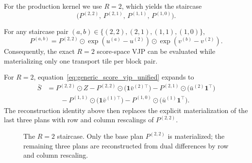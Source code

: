 For the production kernel we use $R=2$, which yields the staircase
\[
\bigl(P^{(2,2)},\,P^{(2,1)},\,P^{(1,1)},\,P^{(1,0)}\bigr).
\]

\begin{proposition}\label{thm:single_base_main}
For any staircase pair $(a,b)\in\{(2,2),(2,1),(1,1),(1,0)\}$,
\[
P^{(a,b)}
=
P^{(2,2)}
\odot
\exp(u^{(a)}-u^{(2)})
\odot
\exp(v^{(b)}-v^{(2)}).
\]
Consequently, the exact $R=2$ score-space VJP can be evaluated while materializing only one transport tile per block pair.
\end{proposition}

For $R=2$, equation~\eqref{eq:generic_score_vjp_unified} expands to
\begin{align}
\bar S
&=
P^{(2,2)} \odot Z
-
P^{(2,2)} \odot \bigl(\mathbf{1}\bar v^{(2)\top}\bigr)
-
P^{(2,1)} \odot \bigl(\bar u^{(2)}\mathbf{1}^\top\bigr) \nonumber \\
&\qquad
-
P^{(1,1)} \odot \bigl(\mathbf{1}\bar v^{(1)\top}\bigr)
-
P^{(1,0)} \odot \bigl(\bar u^{(1)}\mathbf{1}^\top\bigr).
\label{eq:r2_expanded_vjp}
\end{align}
The reconstruction identity above then replaces the explicit materialization of the last three plans with row and column rescalings of $P^{(2,2)}$.

\begin{figure}[h]
    \centering
    \caption{The $R=2$ staircase. Only the base plan $P^{(2,2)}$ is materialized; the remaining three plans are reconstructed from dual differences by row and column rescaling.}
    \label{fig:staircase}
\end{figure}

